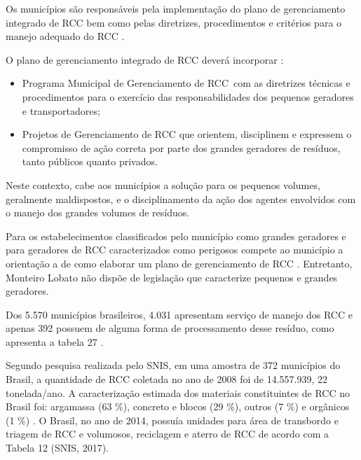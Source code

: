 	
	
	Os municípios são responsáveis pela implementação do plano de gerenciamento integrado de RCC bem como pelas diretrizes, procedimentos e critérios para o manejo adequado do RCC \cite{conama:307}. 
	
	O plano de gerenciamento integrado de RCC deverá incorporar \cite{conama:307}:
	
	\begin{itemize}
		\item Programa Municipal de Gerenciamento de RCC com as diretrizes técnicas e procedimentos para o exercício das responsabilidades dos pequenos geradores e transportadores;
		\item Projetos de Gerenciamento de RCC que orientem, disciplinem e expressem o compromisso de ação correta por parte dos grandes geradores de resíduos, tanto públicos quanto privados.
	\end{itemize}

	Neste contexto, cabe aos municípios a solução para os pequenos volumes, geralmente maldispostos, e o disciplinamento da ação dos agentes envolvidos com o manejo dos grandes volumes de resíduos.

	Para os estabelecimentos classificados pelo município como grandes geradores e para geradores de RCC caracterizados como perigosos compete ao município a orientação a de como elaborar um plano de gerenciamento de RCC \cite{brasil:12305}. Entretanto, Monteiro Lobato não dispõe de legislação que caracterize pequenos e grandes geradores.

	Dos 5.570 municípios brasileiros, 4.031 apresentam serviço de manejo dos RCC e apenas 392 possuem de alguma forma de processamento desse resíduo, como apresenta a tabela 27 \cite{IPEA2012b}. 
	
	
	
	Segundo pesquisa realizada pelo SNIS, em uma amostra de 372 municípios do Brasil, a quantidade de RCC coletada no ano de 2008 foi de 14.557.939, 22 tonelada/ano. A caracterização estimada dos materiais constituintes de RCC no Brasil foi: argamassa (63 \%), concreto e blocos (29 \%), outros (7 \%) e orgânicos (1 \%) \cite{IPEA2012b}. O Brasil, no ano de 2014, possuía unidades para área de transbordo e triagem de RCC e volumosos, reciclagem e aterro de RCC de acordo com a Tabela 12 (SNIS, 2017). 
	
	
	
